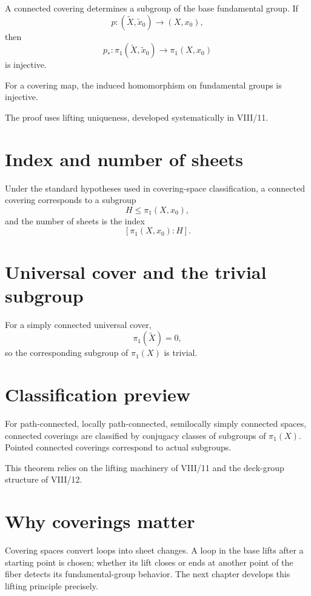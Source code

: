 A connected covering determines a subgroup of the base fundamental group.
If
\[
p:(\widetilde X,\tilde x_0)\to(X,x_0),
\]
then
\[
p_*:\pi_1(\widetilde X,\tilde x_0)\to\pi_1(X,x_0)
\]
is injective.

\begin{theorem}
\label{thm:viii10-pi1-injection}
For a covering map, the induced homomorphism on fundamental groups is injective.
\end{theorem}

The proof uses lifting uniqueness, developed systematically in VIII/11.

\section{Index and number of sheets}

Under the standard hypotheses used in covering-space classification, a
connected covering corresponds to a subgroup
\[
H\le\pi_1(X,x_0),
\]
and the number of sheets is the index
\[
[\pi_1(X,x_0):H].
\]

\section{Universal cover and the trivial subgroup}

For a simply connected universal cover,
\[
\pi_1(\widetilde X)=0,
\]
so the corresponding subgroup of \(\pi_1(X)\) is trivial.

\section{Classification preview}

For path-connected, locally path-connected, semilocally simply connected
spaces, connected coverings are classified by conjugacy classes of subgroups of
\(\pi_1(X)\).  Pointed connected coverings correspond to actual subgroups.

This theorem relies on the lifting machinery of VIII/11 and the deck-group
structure of VIII/12.

\section{Why coverings matter}

Covering spaces convert loops into sheet changes.  A loop in the base lifts
after a starting point is chosen; whether its lift closes or ends at another
point of the fiber detects its fundamental-group behavior.  The next chapter
develops this lifting principle precisely.


